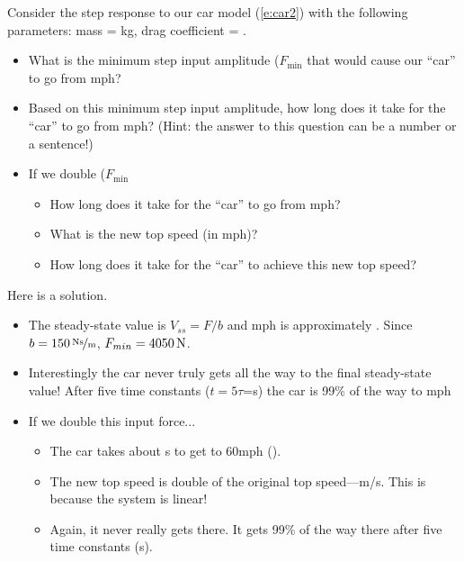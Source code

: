 \begin{ex}
Consider the step response to our car model (\ref{e:car2}) with the following parameters: mass = \unit[750]{kg}, drag coefficient = .
\begin{itemize}
\item What is the minimum step input amplitude ($F_{\mathrm{min}}$ that would cause our ``car'' to go from \unit[0--60]{mph}?
\item Based on this minimum step input amplitude, how long does it take for the ``car'' to go from \unit[0--60]{mph}? (Hint: the answer to this question can be a number or a sentence!)
\item If we double ($F_{\mathrm{min}}$
 \begin{itemize}
 \item How long does it take for the ``car'' to go from \unit[0--60]{mph}?
 \item What is the new top speed (in mph)?
 \item How long does it take for the ``car'' to achieve this new top speed?
 \end{itemize}
\end{itemize}
\end{ex}

\ifsolutions
\begin{soln}
Here is a solution.
\begin{itemize}
\item The steady-state value is $V_{ss}=F/b$ and \unit[60]{mph} is approximately .  Since $b=\unitfrac[150]{Ns}{m}$, $F_{min}=\unit[4050]{N}$.
\item Interestingly the car never truly gets all the way to the final steady-state value!  After five time constants ($t=5\tau$=\unit[25]{s}) the car is 99\% of the way to \unit[60]{mph}
\item If we double this input force...
\begin{itemize}
\item The car takes about \unit[4]{s} to get to \unit{60}{mph} ().
\item The new top speed is double of the original top speed---\unit[120]{m/s}.  This is because the system is linear!
\item Again, it never really gets there.  It gets 99\% of the way there after five time constants (\unit[25]{s}).
\end{itemize}
\end{itemize}
\end{soln}
\fi


